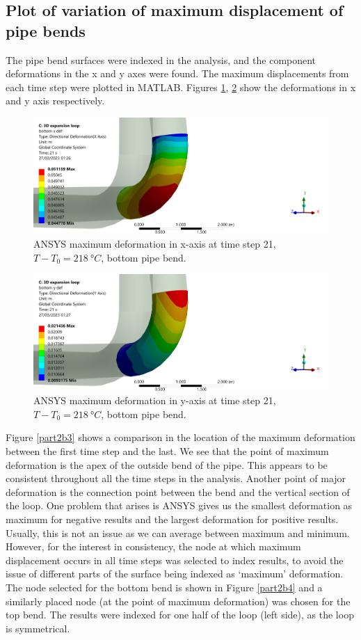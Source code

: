 \subsection{Plot of variation of maximum displacement of pipe bends}
The pipe bend surfaces were indexed in the analysis, and the component deformations in the x and y axes were found. The maximum displacements from each time step were plotted in MATLAB. Figures \ref{part2b1}, \ref{part2b2} show the deformations in x and y axis respectively.
\begin{figure}[H]
    \centering
    \includegraphics[width = \textwidth]{img/part2b-1.png}
    \caption{ANSYS maximum deformation in x-axis at time step 21, $T-T_0 = \SI{218}{\degree C}$, bottom pipe bend.}
    \label{part2b1}
\end{figure}
\begin{figure}[H]
    \centering
    \includegraphics[width = \textwidth]{img/part2b-2.png}
    \caption{ANSYS maximum deformation in y-axis at time step 21, $T-T_0 = \SI{218}{\degree C}$, bottom pipe bend.}
    \label{part2b2}
\end{figure}
Figure \ref{part2b3} shows a comparison in the location of the maximum deformation between the first time step and the last. We see that the point of maximum deformation is the apex of the outside bend of the pipe. This appears to be consistent throughout all the time steps in the analysis. Another point of major deformation is the connection point between the bend and the vertical section of the loop. One problem that arises is ANSYS gives us the smallest deformation as maximum for negative results and the largest deformation for positive results. Usually, this is not an issue as we can average between maximum and minimum. However, for the interest in consistency, the node at which maximum displacement occurs in all time steps was selected to index results, to avoid the issue of different parts of the surface being indexed as `maximum' deformation. The node selected for the bottom bend is shown in Figure \ref{part2b4} and a similarly placed node (at the point of maximum deformation) was chosen for the top bend. The results were indexed for one half of the loop (left side), as the loop is symmetrical.

